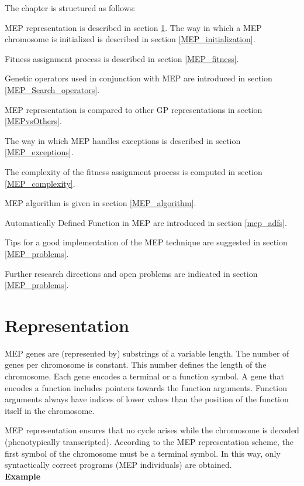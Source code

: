 \documentclass [11pt]{article}
\begin{document}
The chapter is structured as follows:

MEP representation is described in section \ref{MEP_representation}. The way in which a MEP chromosome is initialized is described in section \ref{MEP_initialization}.

Fitness assignment process is described in section \ref{MEP_fitness}.

Genetic operators used in conjunction with MEP are introduced in section \ref{MEP_Search_operators}. 

MEP representation is compared to other GP representations in section \ref{MEPvsOthers}.

The way in which MEP handles exceptions is described in section \ref{MEP_exceptions}.

The complexity of the fitness assignment process is computed in section \ref{MEP_complexity}.

MEP algorithm is given in section \ref{MEP_algorithm}.

Automatically Defined Function in MEP are introduced in section \ref{mep_adfs}.

Tips for a good implementation of the MEP technique are suggested in section \ref{MEP_problems}.

Further research directions and open problems are indicated in section \ref{MEP_problems}.

\section{Representation}\label{MEP_representation}

MEP genes are (represented by) substrings of a variable length. The number 
of genes per chromosome is constant. This number defines the length of the 
chromosome. Each gene encodes a terminal or a function symbol. A gene that 
encodes a function includes pointers towards the function arguments. 
Function arguments always have indices of lower values than the position of 
the function itself in the chromosome.

MEP representation ensures that no cycle arises while the 
chromosome is decoded (phenotypically transcripted). According to the 
MEP representation scheme, the first symbol of the chromosome must be a 
terminal symbol. In this way, only syntactically correct programs (MEP 
individuals) are obtained.\\

\textbf{Example}\\
\end{document}
